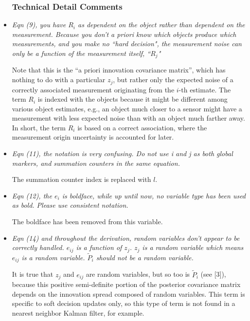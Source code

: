 \documentclass[11pt]{article}
\begin{document}
\begin{itemize}
\subsubsection*{Technical Detail Comments}

\item {\itshape Eqn (9), you have $R_i$ as dependent on the object rather than dependent on the measurement.  Because you don't a priori know which objects produce which measurements, and you make no ``hard decision", the measurement noise can only be a function of the measurement itself, ``$R_j$"}

Note that this is the ``a priori innovation covariance matrix'', which has nothing to do with a particular $z_j$, but rather only the expected noise of a correctly associated measurement originating from the $i$-th estimate. The term $R_i$ is indexed with the objects because it might be different among various object estimates, e.g., an object much closer to a sensor might have a measurement with less expected noise than with an object much farther away. In short, the term $R_i$ is based on a correct association, where the measurement origin uncertainty is accounted for later.

\item {\itshape Eqn (11), the notation is very confusing.  Do not use i and j as both global markers, and summation counters in the same equation.}

The summation counter index is replaced with $l$.

\item {\itshape Eqn (12), the $e_i$ is boldface, while up until now, no variable type has been used as bold.  Please use consistent notation.}

The boldface has been removed from this variable.

\item {\itshape Eqn (14) and throughout the derivation, random variables don't appear to be correctly handled. $e_{ij}$ is a function of $z_j$.  $z_j$ is a random variable which means $e_{ij}$ is a random variable.  $\tilde P_i$ should not be a random variable.}

It is true that $z_j$ and $e_{ij}$ are random variables, but so too is $\tilde P_i$ (see [3]), because this positive semi-definite portion of the posterior covariance matrix depends on the innovation spread composed of random variables. This term is specific to soft decision updates only, so this type of term is not found in a nearest neighbor Kalman filter, for example.


\end{itemize}
\end{document}
